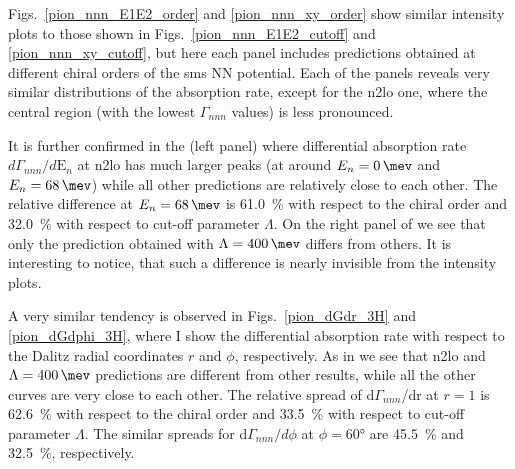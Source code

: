    Figs.~\ref{pion_nnn_E1E2_order} and \ref{pion_nnn_xy_order} show similar intensity plots to those shown in
    Figs.~\ref{pion_nnn_E1E2_cutoff} and \ref{pion_nnn_xy_cutoff}, but here each panel includes
    predictions obtained at different chiral orders of the \gls{sms} NN potential. Each of the panels
    reveals very similar distributions of the absorption rate,
    except for the \gls{n2lo} one, where the central region (with the lowest $\Gamma_{nnn}$ values) is less pronounced.

    It is further confirmed in the  (left panel) where differential absorption rate $d\Gamma_{nnn} /d\text{E}_n$ at \gls{n2lo} has much larger peaks (at around $E_n = \SI{0}{\mev}$ and $E_n = \SI{68}{\mev}$)
    while all other predictions are relatively close to each other.
    The relative difference at $E_n = \SI{68}{\mev}$ is \SI{61.0}{\percent} with respect to the chiral order
    and \SI{32.0}{\percent} with respect to cut-off parameter $\Lambda$.
    On the right panel of  we see that only the prediction obtained with $\Lambda=\SI{400}{\mev}$ differs from others. It is interesting to notice, that such a difference is nearly invisible from the intensity plots.

    A very similar tendency is observed in Figs.~\ref{pion_dGdr_3H} and \ref{pion_dGdphi_3H},
    where I show the differential absorption rate with respect to the Dalitz radial coordinates $r$ and $\phi$, respectively. As in  we see that \gls{n2lo} and $\Lambda = \SI{400}{\mev} $ predictions are different from other results, while all the other curves are very close to each other.
    The relative spread of d$\Gamma_{nnn}$/dr at $r = 1$ is \SI{62.6}{\percent} with respect to the chiral order
    and \SI{33.5}{\percent} with respect to cut-off parameter $\Lambda$.
    The similar spreads for d$\Gamma_{nnn}/d\phi$ at $\phi = \ang{60}$ are \SI{45.5}{\percent}
    and \SI{32.5}{\percent}, respectively.



